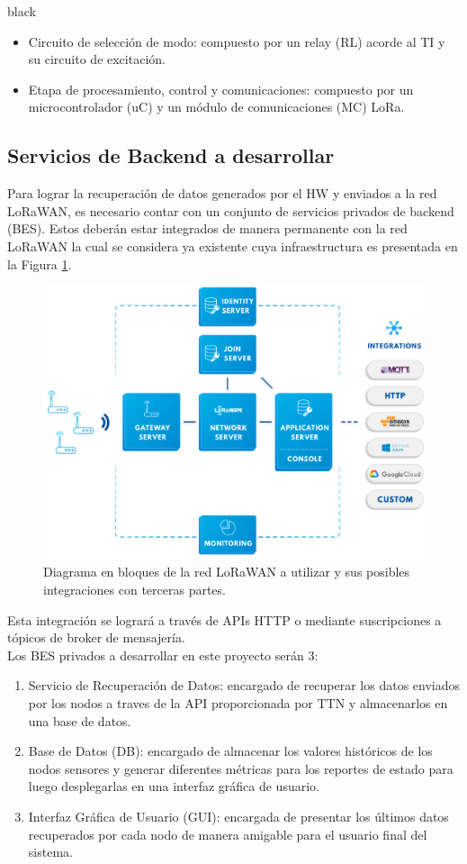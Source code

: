 \documentclass[11pt]{charter}
\begin{document}
\begin{consigna}{black}
\begin{itemize}
	\item Circuito de selección de modo: compuesto por un relay (RL) acorde al TI y su circuito de excitación.\\

	\item Etapa de procesamiento, control y comunicaciones: compuesto por un microcontrolador (uC) y un módulo de comunicaciones (MC) LoRa.\\
\end{itemize}

\subsection{Servicios de Backend a desarrollar}
Para lograr la recuperación de datos generados por el HW y enviados a la red LoRaWAN, es necesario contar con un conjunto de servicios privados de backend (BES). Estos deberán estar integrados de manera permanente con la red LoRaWAN la cual se considera ya existente cuya infraestructura es presentada en la Figura \ref{fig:diagBloquesLoRaWAN}.\\

\begin{figure}[H]
	\centering 
	\includegraphics[width=.7\textwidth]{./Figuras/arquitectura_TTN.png}
	\caption{Diagrama en bloques de la red LoRaWAN a utilizar y sus posibles integraciones con terceras partes.}
	\label{fig:diagBloquesLoRaWAN}
\end{figure}

Esta integración se logrará a través de APIs HTTP o mediante suscripciones a tópicos de broker de mensajería.\\
Los BES privados a desarrollar en este proyecto serán 3:
\begin{enumerate}
	\item Servicio de Recuperación de Datos: encargado de recuperar los datos enviados por los nodos a traves de la API proporcionada por TTN y almacenarlos en una base de datos.
	\item Base de Datos (DB): encargado de almacenar los valores históricos de los nodos sensores y generar diferentes métricas para los reportes de estado para luego desplegarlas en una interfaz gráfica de usuario.
	\item Interfaz Gráfica de Usuario (GUI): encargada de presentar los últimos datos recuperados por cada nodo de manera amigable para el usuario final del sistema.
\end{enumerate}

\end{consigna}
\end{document}

